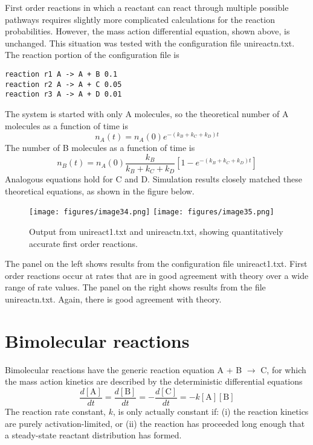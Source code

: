 \documentclass {scrbook}
\begin{document}
First order reactions in which a reactant can react through multiple possible pathways requires slightly more complicated calculations for the reaction probabilities. However, the mass action differential equation, shown above, is unchanged. This situation was tested with the configuration file unireactn.txt. The reaction portion of the configuration file is

\begin{lstlisting}[style=SSAC]
reaction r1 A -> A + B 0.1
reaction r2 A -> A + C 0.05
reaction r3 A -> A + D 0.01
\end{lstlisting}
The system is started with only A molecules, so the theoretical number of A molecules as a function of time is
$$n_A(t) = n_A(0) e^{-(k_B+k_C+k_D)t}$$
The number of B molecules as a function of time is
$$n_B(t) = n_A(0) \frac{k_B}{k_B+k_C+k_D} \left[1-e^{-(k_B+k_C+k_D)t} \right]$$
Analogous equations hold for C and D. Simulation results closely matched these theoretical equations, as shown in the figure below.

\begin{figure}[h]
\centering
\texttt{[image: figures/image34.png]}
\texttt{[image: figures/image35.png]}
\caption{Output from unireact1.txt and unireactn.txt, showing quantitatively accurate first order reactions.}
\label{fig:unireact1}
\end{figure}

The panel on the left shows results from the configuration file unireact1.txt. First order reactions occur at rates that are in good agreement with theory over a wide range of rate values. The panel on the right shows results from the file unireactn.txt. Again, there is good agreement with theory.

\section{Bimolecular reactions}

Bimolecular reactions have the generic reaction equation A + B $\rightarrow$ C, for which the mass action kinetics are described by the deterministic differential equations
$$\frac{d[\textrm{A}]}{dt} = \frac{d[\textrm{B}]}{dt} = -\frac{d[\textrm{C}]}{dt} = -k [\textrm{A}] [\textrm{B}]$$
The reaction rate constant, $k$, is only actually constant if: (i) the reaction kinetics are purely activation-limited, or (ii) the reaction has proceeded long enough that a steady-state reactant distribution has formed.
\end{document}
